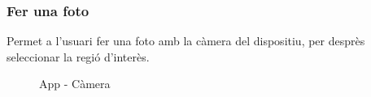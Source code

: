 	\subsubsection{Fer una foto}
		Permet a l'usuari fer una foto amb la càmera del dispositiu, per desprès seleccionar la regió d'interès.\\
		\begin{figure}[H]
			\begin{minipage}{6in}
				\centering
				\hspace*{.2in}
			\end{minipage}
			\caption{App - Càmera}
		\end{figure}
